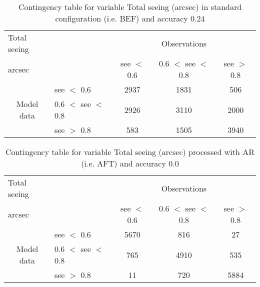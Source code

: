 \documentclass[11pt,english]{article}
\begin{document}
\begin{table}[]
\begin{center}
\begin{tabular}{llccc}
\hline
{Total seeing}                                       &                                                    & \multicolumn{3}{c}{Observations}                 \\
{arcsec}                                       &                             & see $<$ 0.6   & 0.6 $<$ see $<$ 0.8 & see $>$ 0.8 \\
\hline
\multicolumn{1}{c}{\multirow{3}{*}{Model data}}  & see $<$ 0.6             & 2937                & 1831                       & 506              \\
                                                 & 0.6  $<$ see $<$ 0.8 & 2926                & 3110                       & 2000              \\
                                                 & see $>$ 0.8             & 583                & 1505                       & 3940              \\
\hline
\end{tabular}
\end{center}
\caption{Contingency table for variable Total seeing (arcsec) in standard configuration (i.e. BEF) and accuracy 0.24}
\label{tab:contingencyseeBEF}
\end{table}
\begin{table}[]
\begin{center}
\begin{tabular}{llccc}
\hline
{Total seeing}                                       &                                                    & \multicolumn{3}{c}{Observations}                 \\
{arcsec}                                       &                             & see $<$ 0.6   & 0.6 $<$ see $<$ 0.8 & see $>$ 0.8 \\
\hline
\multicolumn{1}{c}{\multirow{3}{*}{Model data}}  & see $<$ 0.6             & 5670                & 816                       & 27              \\
                                                 & 0.6  $<$ see $<$ 0.8 & 765                & 4910                       & 535              \\
                                                 & see $>$ 0.8             & 11                & 720                       & 5884              \\
\hline
\end{tabular}
\end{center}
\caption{Contingency table for variable Total seeing (arcsec) processed with AR (i.e. AFT) and accuracy 0.0}
\label{tab:contingencyseeAFT}
\end{table}
\end{document}
